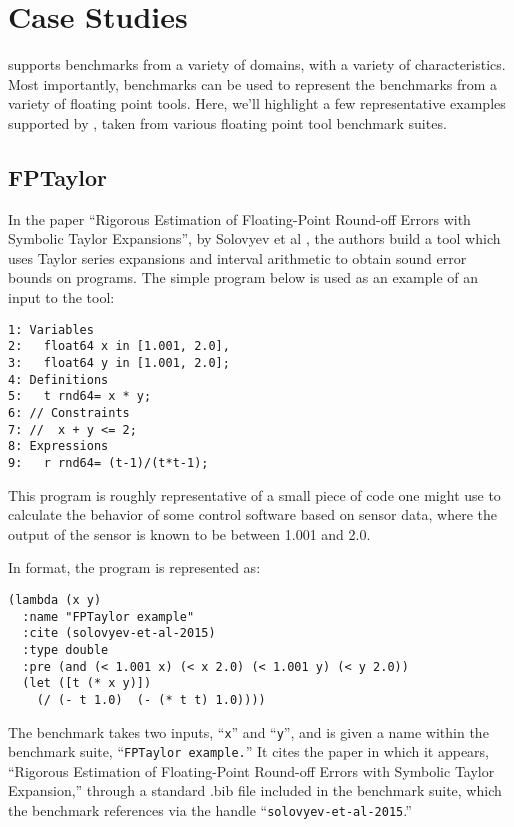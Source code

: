 \documentclass[main.tex]{subfiles}
\begin{document}
\section{Case Studies}

\name supports benchmarks from a variety of domains, with a variety
of characteristics. Most importantly, \name benchmarks can be used
to represent the benchmarks from a variety of floating point
tools. Here, we'll highlight a few representative examples supported
by \name, taken from various floating point tool benchmark suites.

\subsection{FPTaylor}
In the paper ``Rigorous Estimation of Floating-Point Round-off Errors
with Symbolic Taylor Expansions'', by Solovyev et al
\cite{fptaylor-fm15}, the authors build a tool which uses Taylor
series expansions and interval arithmetic to obtain sound error bounds
on programs. The simple program below is used as an example of an input
to the tool:

\begin{verbatim}
1: Variables
2:   float64 x in [1.001, 2.0],
3:   float64 y in [1.001, 2.0];
4: Definitions
5:   t rnd64= x * y;
6: // Constraints
7: //  x + y <= 2;
8: Expressions
9:   r rnd64= (t-1)/(t*t-1);
\end{verbatim}

This program is roughly representative of a small piece of code one
might use to calculate the behavior of some control software based on
sensor data, where the output of the sensor is known to be between
1.001 and 2.0.

In \core format, the program is represented as:

\begin{verbatim}
(lambda (x y)
  :name "FPTaylor example"
  :cite (solovyev-et-al-2015)
  :type double
  :pre (and (< 1.001 x) (< x 2.0) (< 1.001 y) (< y 2.0))
  (let ([t (* x y)])
    (/ (- t 1.0)  (- (* t t) 1.0))))
\end{verbatim}

The benchmark takes two inputs, ``\verb|x|'' and ``\verb|y|'', and is
given a name within the benchmark suite, ``\verb|FPTaylor example.|''
It cites the paper in which it appears, ``Rigorous Estimation of
Floating-Point Round-off Errors with Symbolic Taylor Expansion,''
through a standard .bib file included in the benchmark suite, which
the benchmark references via the handle
``\verb|solovyev-et-al-2015|.''
\end{document}
